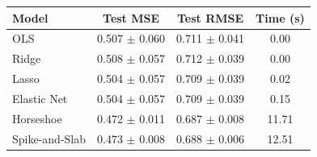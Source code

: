 \begin{tabular}{lccc}
\toprule
Model & Test MSE & Test RMSE & Time (s) \\
\midrule
OLS & 0.507 $\pm$ 0.060 & 0.711 $\pm$ 0.041 & 0.00 \\
Ridge & 0.508 $\pm$ 0.057 & 0.712 $\pm$ 0.039 & 0.00 \\
Lasso & 0.504 $\pm$ 0.057 & 0.709 $\pm$ 0.039 & 0.02 \\
Elastic Net & 0.504 $\pm$ 0.057 & 0.709 $\pm$ 0.039 & 0.15 \\
Horseshoe & 0.472 $\pm$ 0.011 & 0.687 $\pm$ 0.008 & 11.71 \\
Spike-and-Slab & 0.473 $\pm$ 0.008 & 0.688 $\pm$ 0.006 & 12.51 \\
\bottomrule
\end{tabular}